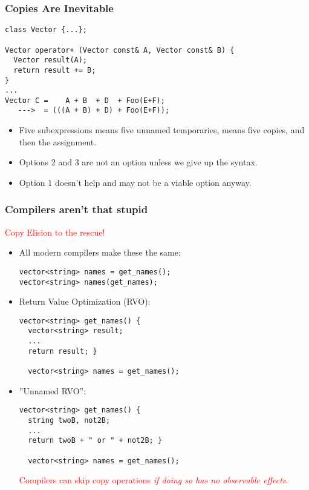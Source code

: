 \begin{frame}[fragile,t]
\frametitle{Copies Are Inevitable}
{\scriptsize
\begin{verbatim}
class Vector {...};

Vector operator+ (Vector const& A, Vector const& B) {
  Vector result(A);
  return result += B;
}
...
Vector C =    A + B  + D  + Foo(E+F);
   --->  = (((A + B) + D) + Foo(E+F));
\end{verbatim}
}

\begin{itemize}
\item Five subexpressions means five unnamed temporaries, means five
  copies, and then the assignment.
\item Options 2 and 3 are not an option unless we give up the syntax.
\item Option 1 doesn't help and may not be a viable option anyway.
\end{itemize}



\end{frame}


\begin{frame}[fragile,t]
\frametitle{Compilers aren't that stupid}

\textcolor{red}{Copy Elision to the rescue!}

\begin{itemize}
\item<1-> All modern compilers make these the same:
{\scriptsize
\begin{verbatim}
vector<string> names = get_names();
vector<string> names(get_names);
\end{verbatim}}

\item<1->Return Value Optimization (RVO):{\scriptsize
\begin{verbatim}
vector<string> get_names() {
  vector<string> result;
  ...
  return result; } 

  vector<string> names = get_names();
\end{verbatim}}

\item<1->''Unnamed RVO'':{\scriptsize
\begin{verbatim}
vector<string> get_names() {
  string twoB, not2B;
  ...
  return twoB + " or " + not2B; } 

  vector<string> names = get_names();
\end{verbatim}}

\textcolor{red}{Compilers can skip copy operations \emph{if doing so
    has no observable effects}.}
\end{itemize}
\end{frame}

